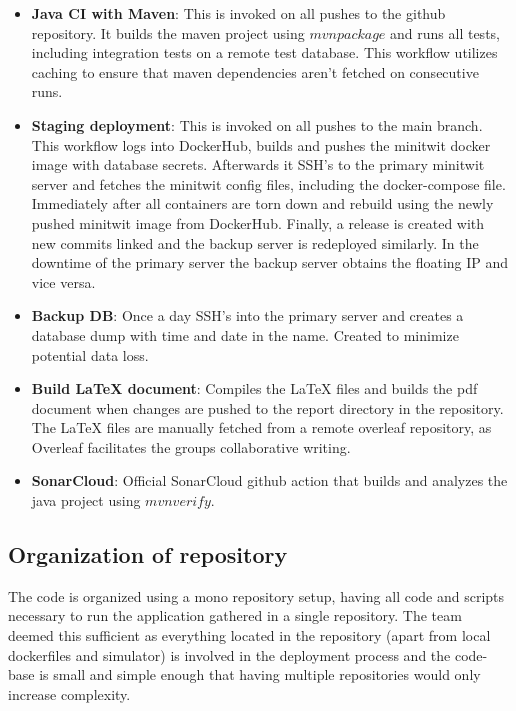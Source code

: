 \begin{itemize}
    \item \textbf{Java CI with Maven}: This is invoked on all pushes to the github repository. It builds the maven project using $mvn package$ and runs all tests, including integration tests on a remote test database. This workflow utilizes caching to ensure that maven dependencies aren't fetched on consecutive runs. 
    \item \textbf{Staging deployment}: This is invoked on all pushes to the main branch. This workflow logs into DockerHub, builds and pushes the minitwit docker image with database secrets. Afterwards it SSH's to the primary minitwit server and fetches the minitwit config files, including the docker-compose file. Immediately after all containers are torn down and rebuild using the newly pushed minitwit image from DockerHub. Finally, a release is created with new commits linked and the backup server is redeployed similarly. In the downtime of the primary server the backup server obtains the floating IP and vice versa. 
    \item \textbf{Backup DB}: Once a day SSH's into the primary server and creates a database dump with time and date in the name. Created to minimize potential data loss. 
    \item \textbf{Build LaTeX document}: Compiles the LaTeX files and builds the pdf document when changes are pushed to the report directory in the repository. The LaTeX files are manually fetched from a remote overleaf repository, as Overleaf facilitates the groups collaborative writing. 
    \item \textbf{SonarCloud}: Official SonarCloud github action that builds and analyzes the java project using $mvn verify$. 
\end{itemize}


\subsection{Organization of repository}
The code is organized using a mono repository setup, having all code and scripts necessary to run the application gathered in a single repository. The team deemed this sufficient as everything located in the repository (apart from local dockerfiles and simulator) is involved in the deployment process and the code-base is small and simple enough that having multiple repositories would only increase complexity. 


